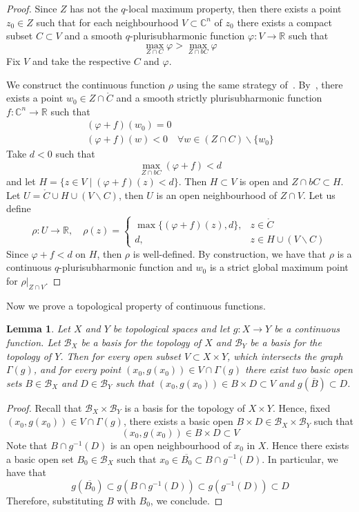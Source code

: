 \documentclass[reqno,oneside]{amsart}
\newcommand{\numberset}{\mathbb}
\newcommand{\R}{\numberset{R}}
\newcommand{\C}{\numberset{C}}
\renewcommand{\phi}{\varphi}
\theoremstyle{definition}
\theoremstyle{plain}
\newtheorem{lemma}[definition]{Lemma}
\theoremstyle{remark}
\begin{document}
\begin{proof}
	Since $Z$ has not the $q$-local maximum property, then there exists a point $z_0\in Z$ such that for each neighbourhood $V\subset\C^n$ of $z_0$ there exists a compact subset $C\subset V$ and a smooth $q$-plurisubharmonic function $\phi:V\to\R$ such that
	\[
		\max_{Z\cap C}\phi>\max_{Z\cap bC}\phi
	\]
	Fix $V$ and take the respective $C$ and $\phi$.
	
	We construct the continuous function $\rho$ using the same strategy of~\cite[Theorem~5.1]{slodkowski:loc_max_property}. By~\cite[Lemma~2.2]{slodkowski:loc_max_property}, there exists a point $w_0\in Z\cap\mathring{C}$ and a smooth strictly plurisubharmonic function $f:\C^n\to\R$ such that
	\begin{gather*}
		(\phi+f)(w_0)=0 \\
		(\phi+f)(w)<0 \quad \forall w\in(Z\cap C)\smallsetminus\{w_0\}
	\end{gather*}
	Take $d<0$ such that
	\[
		\max_{Z\cap bC}(\phi+f)<d
	\]
	and let $H=\{z\in V \mid (\phi+f)(z)<d\}$. Then $H\subset V$ is open and $Z\cap bC\subset H$. Let $U=\mathring{C}\cup H\cup(V\smallsetminus C)$, then $U$ is an open neighbourhood of $Z\cap V$. Let us define
	\[
		\rho:U\to\R, \quad \rho(z)=
		\begin{cases}
			\max\{(\phi+f)(z),d\}, & z\in\mathring{C} \\
			d, & z\in H\cup(V\smallsetminus C)
		\end{cases}
	\]
	Since $\phi+f<d$ on $H$, then $\rho$ is well-defined. By construction, we have that $\rho$ is a continuous $q$-plurisubharmonic function and $w_0$ is a strict global maximum point for $\rho|_{Z\cap V}$.
\end{proof}

Now we prove a topological property of continuous functions.
\begin{lemma}
\label{lemma:bases}
	Let $X$ and $Y$ be topological spaces and let $g:X\to Y$ be a continuous function. Let $\mathcal{B}_X$ be a basis for the topology of $X$ and $\mathcal{B}_Y$ be a basis for the topology of $Y$. Then for every open subset $V\subset X\times Y$, which intersects the graph $\Gamma(g)$, and for every point $(x_0,g(x_0))\in V\cap\Gamma(g)$ there exist two basic open sets $B\in\mathcal{B}_X$ and $D\in\mathcal{B}_Y$ such that $(x_0,g(x_0))\in  B\times D\subset V$ and $g(\overline{B})\subset D$.
\end{lemma}
\begin{proof}
	Recall that $\mathcal{B}_X\times\mathcal{B}_Y$ is a basis for the topology of $X\times Y$. Hence, fixed $(x_0,g(x_0))\in V\cap\Gamma(g)$, there exists a basic open $B\times D\in\mathcal{B}_X\times\mathcal{B}_Y$ such that
	\[
		(x_0,g(x_0))\in B\times D\subset V
	\]
	Note that $B\cap g^{-1}(D)$ is an open neighbourhood of $x_0$ in $X$. Hence there exists a basic open set $B_0\in\mathcal{B}_X$ such that $x_0\in\overline{B_0}\subset B\cap g^{-1}(D)$. In particular, we have that
	\[
		g(\overline{B_0})\subset g(B\cap g^{-1}(D))\subset g(g^{-1}(D))\subset D
	\]
	Therefore, substituting $B$ with $B_0$, we conclude.
\end{proof}
\end{document}
